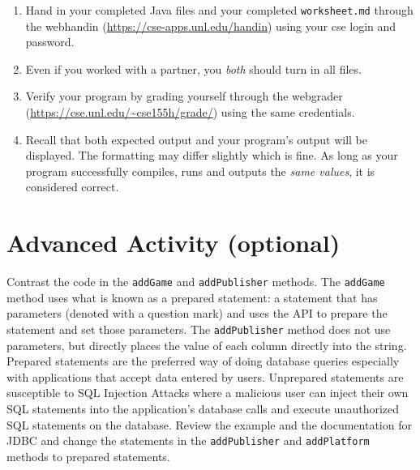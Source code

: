 \documentclass[12pt]{scrartcl}
\begin{document}
\begin{enumerate}
  \item Hand in your completed Java files and your 
  completed \texttt{worksheet.md}
  through the webhandin (\url{https://cse-apps.unl.edu/handin}) 
  using your cse login and password.  
  \item Even if you worked with a partner, you \emph{both} should
  turn in all files.
  \item Verify your program by grading yourself through the
  webgrader (\url{https://cse.unl.edu/~cse155h/grade/}) using the
  same credentials.
  \item Recall that both expected output and your program's output
  will be displayed.  The formatting may differ slightly which is fine.
  As long as your program successfully compiles, runs and outputs 
  the \emph{same values}, it is considered correct.
\end{enumerate}


\section{Advanced Activity (optional)}

Contrast the code in the \texttt{addGame} and \texttt{addPublisher} 
methods.  The \texttt{addGame} method uses what is known 
as a prepared statement: a statement that has parameters (denoted 
with a question mark) and uses the API to prepare the statement and 
set those parameters.  The \texttt{addPublisher} method 
does not use parameters, but directly places the value of each column 
directly into the string.  Prepared statements are the preferred way of 
doing database queries especially with applications that accept data 
entered by users.  Unprepared statements are susceptible to SQL 
Injection Attacks where a malicious user can inject their own SQL 
statements into the application's database calls and execute unauthorized 
SQL statements on the database.  Review the example and the 
documentation for JDBC and change the statements in the 
\texttt{addPublisher} and \texttt{addPlatform} 
methods to prepared statements.

	
\end{document}
